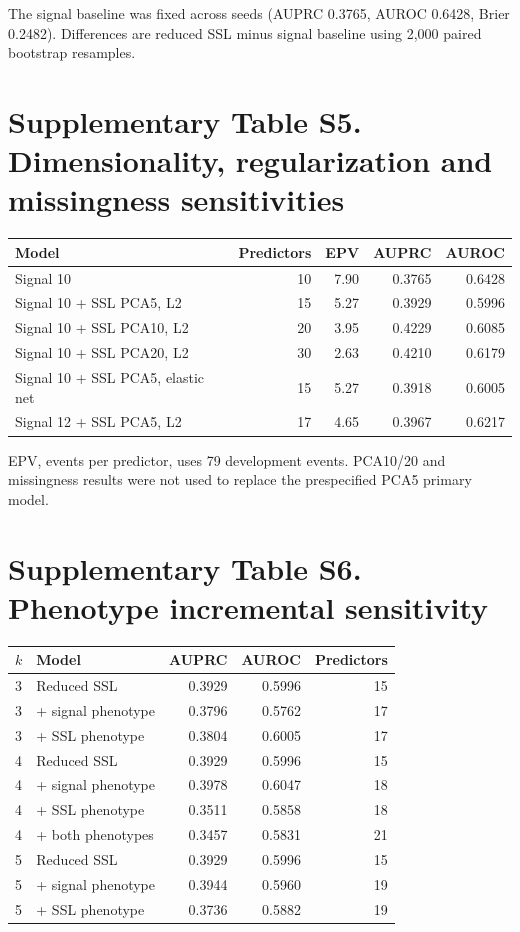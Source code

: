 \documentclass[11pt]{article}
\begin{document}
The signal baseline was fixed across seeds (AUPRC 0.3765, AUROC 0.6428, Brier 0.2482). Differences are reduced SSL minus signal baseline using 2,000 paired bootstrap resamples.

\section*{Supplementary Table S5. Dimensionality, regularization and missingness sensitivities}
\begin{tabular}{lrrrr}
\toprule
Model & Predictors & EPV & AUPRC & AUROC \\
\midrule
Signal 10 & 10 & 7.90 & 0.3765 & 0.6428 \\
Signal 10 + SSL PCA5, L2 & 15 & 5.27 & 0.3929 & 0.5996 \\
Signal 10 + SSL PCA10, L2 & 20 & 3.95 & 0.4229 & 0.6085 \\
Signal 10 + SSL PCA20, L2 & 30 & 2.63 & 0.4210 & 0.6179 \\
Signal 10 + SSL PCA5, elastic net & 15 & 5.27 & 0.3918 & 0.6005 \\
Signal 12 + SSL PCA5, L2 & 17 & 4.65 & 0.3967 & 0.6217 \\
\bottomrule
\end{tabular}

EPV, events per predictor, uses 79 development events. PCA10/20 and missingness results were not used to replace the prespecified PCA5 primary model.

\section*{Supplementary Table S6. Phenotype incremental sensitivity}
\begin{tabular}{llrrr}
\toprule
$k$ & Model & AUPRC & AUROC & Predictors \\
\midrule
3 & Reduced SSL & 0.3929 & 0.5996 & 15 \\
3 & + signal phenotype & 0.3796 & 0.5762 & 17 \\
3 & + SSL phenotype & 0.3804 & 0.6005 & 17 \\
4 & Reduced SSL & 0.3929 & 0.5996 & 15 \\
4 & + signal phenotype & 0.3978 & 0.6047 & 18 \\
4 & + SSL phenotype & 0.3511 & 0.5858 & 18 \\
4 & + both phenotypes & 0.3457 & 0.5831 & 21 \\
5 & Reduced SSL & 0.3929 & 0.5996 & 15 \\
5 & + signal phenotype & 0.3944 & 0.5960 & 19 \\
5 & + SSL phenotype & 0.3736 & 0.5882 & 19 \\
\bottomrule
\end{tabular}
\end{document}
